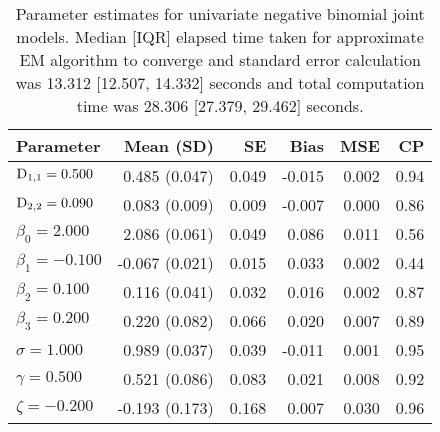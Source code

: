 \begin{table}[ht]
\centering
{}
\captionsetup{font=scriptsize}
\begingroup\scriptsize
\begin{tabular}{l|rrrrr}
  Parameter & Mean (SD) & SE & Bias & MSE & CP \\ 
  \hline
  $\mathrm{D}_{1,1} = 0.500$ &  0.485 (0.047) & 0.049 & -0.015 & 0.002 & 0.94 \\ 
  $\mathrm{D}_{2,2} = 0.090$ &  0.083 (0.009) & 0.009 & -0.007 & 0.000 & 0.86 \\ 
  $\beta_{0} = 2.000$ &  2.086 (0.061) & 0.049 &  0.086 & 0.011 & 0.56 \\ 
  $\beta_{1} = -0.100$ & -0.067 (0.021) & 0.015 &  0.033 & 0.002 & 0.44 \\ 
  $\beta_{2} = 0.100$ &  0.116 (0.041) & 0.032 &  0.016 & 0.002 & 0.87 \\ 
  $\beta_{3} = 0.200$ &  0.220 (0.082) & 0.066 &  0.020 & 0.007 & 0.89 \\ 
  $\sigma = 1.000$ &  0.989 (0.037) & 0.039 & -0.011 & 0.001 & 0.95 \\ 
  $\gamma = 0.500$ &  0.521 (0.086) & 0.083 &  0.021 & 0.008 & 0.92 \\ 
  $\zeta = -0.200$ & -0.193 (0.173) & 0.168 &  0.007 & 0.030 & 0.96 \\ 
   \hline
\end{tabular}
\endgroup
\caption{Parameter estimates for univariate negative binomial joint models. Median [IQR] elapsed time taken for approximate EM algorithm to converge and standard error calculation was 13.312 [12.507, 14.332] seconds and total computation time was 28.306 [27.379, 29.462] seconds.} 
\label{tab:appendix-GMVJM-univs-NB}
\end{table}

